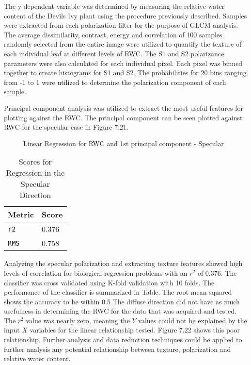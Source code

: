 The y dependent variable was determined by measuring the relative water content of the Devils Ivy plant using the procedure previously described.  Samples were extracted from each polarization filter for the purpose of GLCM analysis.  The average dissimilarity, contrast, energy and correlation of 100 samples randomly selected from the entire image were utilized to quantify the texture of each individual leaf at different levels of RWC.  The S1 and S2 polarizance parameters were also calculated for each individual pixel. Each pixel was binned together to create histograms for S1 and S2.  The probabilities for 20 bins ranging from -1 to 1 were utilized to determine the polarization component of each sample.

Principal component analysis was utilized to extract the most useful features for plotting against the RWC.  The principal component can be seen plotted against RWC for the specular case in Figure 7.21.
%
\begin{figure}[!htb]
    \begin{center}
    \end{center}
    \caption{Linear Regression for RWC and 1st principal component - Specular}
    \label{fig:polarization}
\end{figure}
%
%
\begin{table}[htb]
  \centering
  \begin{tabular}{ll}
    \toprule
    \textbf{Metric} & \textbf{Score}\\
    \midrule
      \texttt{r2} & 0.376 \\
      \texttt{RMS} & 0.758 \\
    \bottomrule
  \end{tabular}
  \caption{%
    Scores for Regression in the Specular Direction
  }
  \label{tab:Packages}
\end{table}
%
Analyzing the specular polarization and extracting texture features showed high levels of correlation for biological regression problems with an $r^2$ of 0.376.  The classifier was cross validated using K-fold validation with 10 folds.  The performance of the classifier is summarized in Table.
The root mean squared shows the accuracy to be within 0.5%
%
The diffuse direction did not have as much usefulness in determining the RWC for the data that was acquired and tested.  The $r^2$ value was nearly zero, meaning the $Y$ values could not be explained by the input $X$ variables for the linear relationship tested. Figure 7.22 shows this poor relationship.  Further analysis and data reduction techniques could be applied to further analysis any potential relationship between texture, polarization and relative water content.
